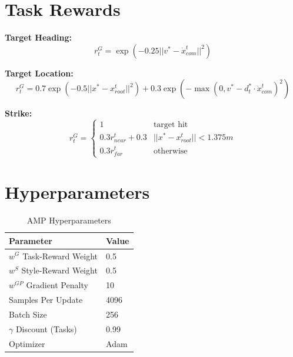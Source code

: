 \documentclass[acmtog]{acmart}
\begin{document}
\begin{appendix}
\section{Task Rewards}
\textbf{Target Heading:}
\begin{equation}
    r_t^G = \exp(-0.25 ||v^* - \dot{x}_{com}^t||^2)
\end{equation}

\textbf{Target Location:}
\begin{equation}
    r_t^G = 0.7 \exp(-0.5 ||x^* - x_{root}^t||^2) + 0.3 \exp(-\max(0, v^* - d_t^* \cdot \dot{x}_{com}^t)^2)
\end{equation}

\textbf{Strike:}
\begin{equation}
    r_t^G = 
    \begin{cases} 
      1 & \text{target hit} \\
      0.3 r_{near}^t + 0.3 & ||x^* - x_{root}^t|| < 1.375m \\
      0.3 r_{far}^t & \text{otherwise}
   \end{cases}
\end{equation}

\section{Hyperparameters}
\begin{table}[h]
\caption{AMP Hyperparameters}
\label{tab:hyperparams}
\begin{tabular}{ll}
\toprule
Parameter & Value \\
\midrule
$w^G$ Task-Reward Weight & 0.5 \\
$w^S$ Style-Reward Weight & 0.5 \\
$w^{GP}$ Gradient Penalty & 10 \\
Samples Per Update & 4096 \\
Batch Size & 256 \\
$\gamma$ Discount (Tasks) & 0.99 \\
Optimizer & Adam \\
\bottomrule
\end{tabular}
\end{table}

\end{appendix}


 
\end{document}
